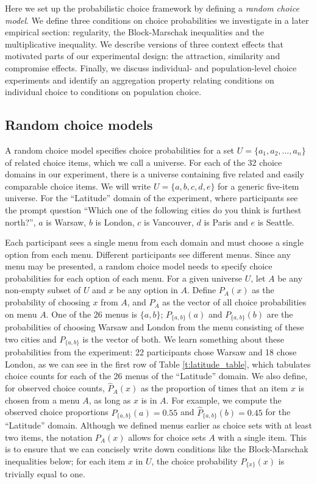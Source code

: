 \documentclass[11pt,letter]{article}
\newcommand{\menu}{menu}
\newcommand{\menus}{menus}
\newcommand{\univ}{U}
\begin{document}
Here we set up the probabilistic choice framework by defining a {\em random choice model}.
We define three conditions on choice probabilities we investigate in a later empirical section: regularity, the Block-Marschak inequalities and the multiplicative inequality.
We describe versions of three context effects that motivated parts of our experimental design: the attraction, similarity and compromise effects.
Finally, we discuss individual- and population-level choice experiments and identify an aggregation property relating conditions on individual choice to conditions on population choice.

\subsection{Random choice models}

A random choice model specifies choice probabilities for a set $\univ = \{a_1, a_2, \ldots, a_n\}$ of related choice items, which we call a universe.
For each of the 32 choice domains in our experiment, there is a  universe containing five related and easily comparable choice items.
We will write $\univ = \{a,b,c,d,e\}$ for a generic five-item universe.
For the ``Latitude'' domain of the experiment, where participants see the prompt question ``Which one of the following cities do you think is furthest north?'', $a$ is Warsaw, $b$ is London, $c$ is Vancouver, $d$ is Paris and $e$ is Seattle.

Each participant sees a single \menu{} from each domain and must choose a single option from each \menu{}.
Different participants see different \menus{}.
Since any \menu{} may be presented, a random choice model needs to specify choice probabilities for each option of each \menu{}.
For a given universe $\univ$, let $A$ be any non-empty subset of $\univ$ and $x$ be any option in $A$.
Define $P_A(x)$ as the probability of choosing $x$ from $A$, and $P_A$ as the vector of all choice probabilities on \menu{} $A$.
One of the 26 \menus{} is $\{a,b\}$; $P_{\{a,b\}}(a)$ and $P_{\{a,b\}}(b)$ are the probabilities of choosing Warsaw and London from the \menu{} consisting of these two cities and $P_{\{a,b\}}$ is the vector of both.
We learn something about these probabilities from the experiment: 22 participants chose Warsaw and 18 chose London, as we can see in the first row of Table \ref{t:latitude_table}, which tabulates choice counts for each of the 26 \menus{} of the ``Latitude'' domain.
We also define, for observed choice counts, $\hat P_A(x)$ as the proportion of times that an item $x$ is chosen from a \menu{} $A$, as long as $x$ is in $A$.
For example, we compute the observed choice proportions $\hat P_{\{a,b\}}(a) = 0.55$ and $\hat P_{\{a,b\}}(b) = 0.45$ for the ``Latitude'' domain.
Although we defined \menus{} earlier as choice sets with at least two items, the notation $P_A(x)$ allows for choice sets $A$ with a single item.
This is to ensure that we can concisely write down conditions like the Block-Marschak inequalities below; for each item $x$ in $\univ$, the choice probability $P_{\{x\}}(x)$ is trivially equal to one.
\end{document}
